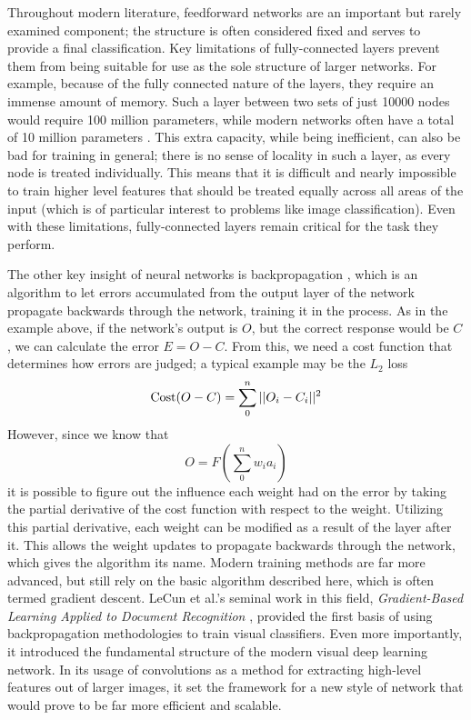 Throughout modern literature, feedforward networks are an important but rarely examined component; the structure is often considered fixed and serves to provide a final classification.
Key limitations of fully-connected layers prevent them from being suitable for use as the sole structure of larger networks.
For example, because of the fully connected nature of the layers, they require an immense amount of memory.
Such a layer between two sets of just 10000 nodes would require 100 million parameters, while modern networks often have a total of 10 million parameters \cite{han2015learning}.
This extra capacity, while being inefficient, can also be bad for training in general; there is no sense of locality in such a layer, as every node is treated individually.
This means that it is difficult and nearly impossible to train higher level features that should be treated equally across all areas of the input (which is of particular interest to problems like image classification).
Even with these limitations, fully-connected layers remain critical for the task they perform.

The other key insight of neural networks is backpropagation \cite{hecht1988theory}, which is an algorithm to let errors accumulated from the output layer of the network propagate backwards through the network, training it in the process.
As in the example above, if the network's output is $O$, but the correct response would be $C$, we can calculate the error $E = O - C$.
From this, we need a cost function that determines how errors are judged; a typical example may be the $L_2$ loss
\[\operatorname{Cost}(O - C) = \sum_0^n || O_i - C_i ||^2 \]
However, since we know that
\[O = F\left(\sum_0^n w_i a_i\right)\]
it is possible to figure out the influence each weight had on the error by taking the partial derivative of the cost function with respect to the weight.
Utilizing this partial derivative, each weight can be modified as a result of the layer after it.
This allows the weight updates to propagate backwards through the network, which gives the algorithm its name.
Modern training methods are far more advanced, but still rely on the basic algorithm described here, which is often termed gradient descent.
LeCun et al.'s seminal work in this field, \emph{Gradient-Based Learning Applied to Document Recognition} \cite{lecun1998gradient}, provided the first basis of using backpropagation methodologies to train visual classifiers.
Even more importantly, it introduced the fundamental structure of the modern visual deep learning network.
In its usage of convolutions as a method for extracting high-level features out of larger images, it set the framework for a new style of network that would prove to be far more efficient and scalable.

